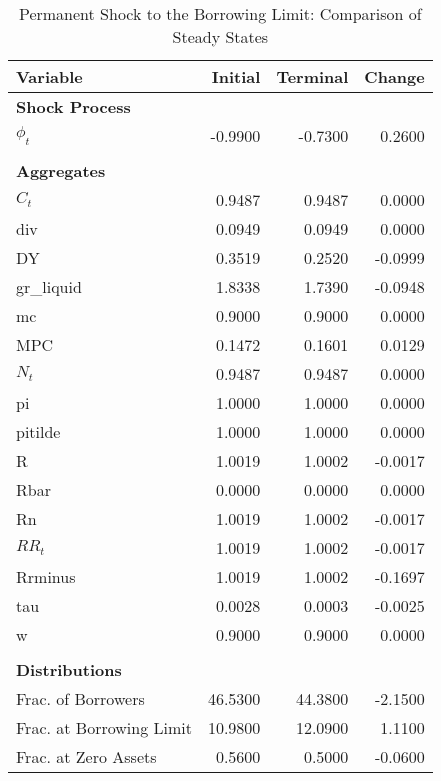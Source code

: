 \documentclass[12pt]{article} %
\numberwithin{equation}{section} %
\begin{document}
\begin{table}[h]
\centering
\caption{Permanent Shock to the Borrowing Limit: Comparison of Steady States}
\label{tab:stst_Baseline_Limit_Permanent}
\begin{tabular}{lrrr}
                Variable &  Initial &  Terminal &  Change \\
\hline
\hline
\multicolumn{2}{l}{\textbf{Shock Process}} & & \\
              $\phi_t$ &  -0.9900 &   -0.7300 &  0.2600 \\
              & & & \\
\multicolumn{2}{l}{\textbf{Aggregates}} & & \\
                       $C_t$ &   0.9487 &    0.9487 &  0.0000 \\
                     div &   0.0949 &    0.0949 &  0.0000 \\
                      DY &   0.3519 &    0.2520 & -0.0999 \\
               gr\_liquid &   1.8338 &    1.7390 & -0.0948 \\
                      mc &   0.9000 &    0.9000 &  0.0000 \\
                     MPC &   0.1472 &    0.1601 &  0.0129 \\
                       $N_t$ &   0.9487 &    0.9487 &  0.0000 \\
                      pi &   1.0000 &    1.0000 &  0.0000 \\
                 pitilde &   1.0000 &    1.0000 &  0.0000 \\
                       R &   1.0019 &    1.0002 & -0.0017 \\
                    Rbar &   0.0000 &    0.0000 &  0.0000 \\
                      Rn &   1.0019 &    1.0002 & -0.0017 \\
                      $RR_t$ &   1.0019 &    1.0002 & -0.0017 \\
                 Rrminus &   1.0019 &    1.0002 & -0.1697 \\
                     tau &   0.0028 &    0.0003 & -0.0025 \\
                       w &   0.9000 &    0.9000 &  0.0000 \\
               & & & \\
\multicolumn{2}{l}{\textbf{Distributions}} & & \\
      Frac. of Borrowers &  46.5300 &   44.3800 & -2.1500 \\
Frac. at Borrowing Limit &  10.9800 &   12.0900 &  1.1100 \\
    Frac. at Zero Assets &   0.5600 &    0.5000 & -0.0600 \\
\hline
\end{tabular}
\end{table}
\end{document}

